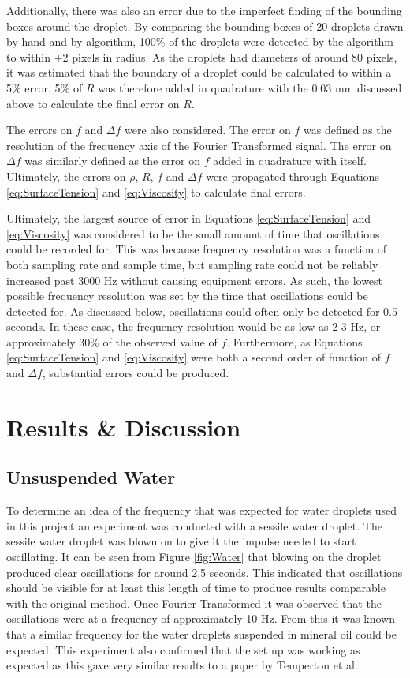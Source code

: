 \documentclass{physics_article_B}
\begin{document}
    Additionally, there was also an error due to the imperfect finding of the bounding boxes around the droplet. By comparing the bounding boxes of 20 droplets drawn by hand and by algorithm, 100\% of the droplets were detected by the algorithm to within $\pm$2 pixels in radius. As the droplets had diameters of around 80 pixels, it was estimated that the boundary of a droplet could be calculated to within a 5\% error. 5\% of $R$ was therefore added in quadrature with the 0.03 mm discussed above to calculate the final error on $R$. 
    
    The errors on $f$ and $\Delta f$ were also considered. The error on $f$ was defined as the resolution of the frequency axis of the Fourier Transformed signal. The error on $\Delta f$ was similarly defined as the error on $f$ added in quadrature with itself. Ultimately, the errors on $\rho$, $R$, $f$ and $\Delta f$ were propagated through Equations \ref{eq:SurfaceTension} and \ref{eq:Viscosity} to calculate final errors.
    
    Ultimately, the largest source of error in Equations \ref{eq:SurfaceTension} and \ref{eq:Viscosity} was considered to be the small amount of time that oscillations could be recorded for. This was because frequency resolution was a function of both sampling rate and sample time, but sampling rate could not be reliably increased past 3000 Hz without causing equipment errors. As such, the lowest possible frequency resolution was set by the time that oscillations could be detected for. As discussed below, oscillations could often only be detected for 0.5 seconds. In these case, the frequency resolution would be as low as 2-3 Hz, or approximately 30\% of the observed value of $f$. Furthermore, as Equations \ref{eq:SurfaceTension} and \ref{eq:Viscosity} were both a second order of function of $f$ and $\Delta f$, substantial errors could be produced. 
    
\section{Results \& Discussion}

\subsection{Unsuspended Water}
 	
        To determine an idea of the frequency that was expected for water droplets used in this project an experiment was conducted with a sessile water droplet. The sessile water droplet was blown on to give it the impulse needed to start oscillating. It can be seen from Figure \ref{fig:Water} that blowing on the droplet produced clear oscillations for around 2.5 seconds. This indicated that oscillations should be visible for at least this length of time to produce results comparable with the original method. Once Fourier Transformed it was observed that the oscillations were at a frequency of approximately 10 Hz. From this it was known that a similar frequency for the water droplets suspended in mineral oil could be expected. This experiment also confirmed that the set up was working as expected as this gave very similar results to a paper by Temperton et al\cite{Temperton2012}. 
 
\end{document}

